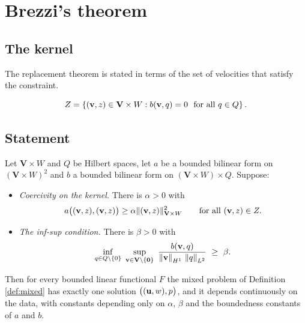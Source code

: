 \documentclass[11pt,a4paper]{article}
\newcommand{\Vsp}{\mathbf{V}}
\newcommand{\Qsp}{Q}
\newcommand{\Wsp}{W}
\newcommand{\Zsp}{Z}
\newcommand{\bzero}{\mathbf{0}}
\begin{document}
\section{Brezzi's theorem}

\subsection{The kernel}

The replacement theorem is stated in terms of the set of velocities that satisfy
the constraint.

\begin{definition}[Kernel of $b$]\label{def:kernel}
\[
  \Zsp = \left\{ (\bv,z) \in \Vsp \times \Wsp
  : b(\bv,q) = 0 \ \text{ for all } q \in \Qsp \right\} .
\]
\end{definition}

\subsection{Statement}

\begin{theorem}[Brezzi]\label{thm:brezzi}
Let $\Vsp \times \Wsp$ and $\Qsp$ be Hilbert spaces, let $a$ be a bounded
bilinear form on $(\Vsp\times\Wsp)^{2}$ and $b$ a bounded bilinear form on
$(\Vsp\times\Wsp)\times\Qsp$. Suppose:

\begin{itemize}
\item[\textbf{(B1)}] \emph{Coercivity on the kernel.} There is $\alpha > 0$ with
\[
  a\big( (\bv,z),(\bv,z) \big)
  \ge \alpha \lVert (\bv,z) \rVert_{\Vsp\times\Wsp}^{2}
  \qquad \text{for all } (\bv,z) \in \Zsp .
\]

\item[\textbf{(B2)}] \emph{The inf-sup condition.} There is $\beta > 0$ with
\[
  \inf_{q \in \Qsp \setminus \{0\}} \
  \sup_{\bv \in \Vsp \setminus \{\bzero\}} \
  \frac{b(\bv,q)}{\normH{\bv}\,\normL{q}} \ \ge\ \beta .
\]
\end{itemize}

Then for every bounded linear functional $F$ the mixed problem of Definition
\ref{def:mixed} has exactly one solution $\big( (\mathbf{u},w),p \big)$, and it depends
continuously on the data, with constants depending only on $\alpha$, $\beta$ and
the boundedness constants of $a$ and $b$.
\end{theorem}
\end{document}
